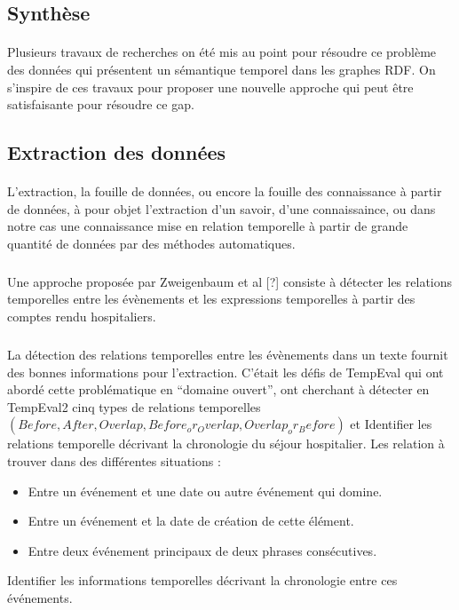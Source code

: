 \subsection*{Synthèse}
\paragraph{}
Plusieurs travaux de recherches on été mis au point pour résoudre ce problème des données qui présentent un sémantique temporel dans les graphes RDF. On s'inspire de ces travaux pour proposer une nouvelle approche qui peut être satisfaisante pour résoudre ce gap.
\subsection*{Extraction des données}
\paragraph{}
L'extraction, la fouille de données, ou encore la fouille des connaissance à partir de données, à pour  objet l'extraction d'un savoir, d'une connaissaince, ou dans notre cas une connaissance mise en relation temporelle à partir de grande quantité de données par des méthodes automatiques.
\subparagraph{}
Une approche proposée par Zweigenbaum et al%
[?] consiste à détecter les relations temporelles entre les évènements et les expressions temporelles à partir des comptes rendu hospitaliers.
\subparagraph{}
La détection des relations temporelles entre les évènements dans un texte fournit des bonnes informations pour l’extraction.
\newline
C’était les défis de TempEval qui ont abordé cette problématique en “domaine ouvert”, ont cherchant à détecter en TempEval2 cinq types de relations temporelles 
$(Before, After, Overlap, Before_or_Overlap, Overlap_or_Before)$
et Identifier les relations temporelle décrivant la chronologie du séjour hospitalier.
\newline
Les relation à trouver dans des différentes situations :
\begin{itemize}
\item{}Entre un événement et une date ou autre événement qui domine.
\item{}Entre un événement et la date de création de cette élément.
\item{}Entre deux événement principaux de deux phrases consécutives.
\end{itemize}
Identifier les informations temporelles décrivant la chronologie entre ces événements.
